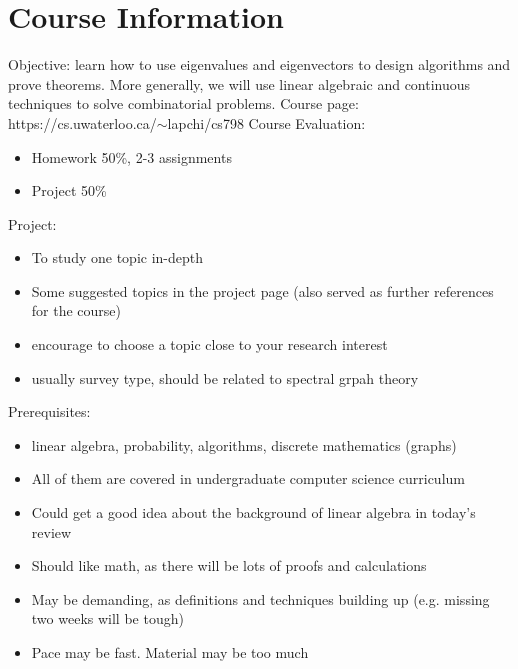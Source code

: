 \documentclass[11pt,a4paper]{report}
\theoremstyle{theoremdd}
\theoremstyle{claims1}
\theoremstyle{proofs1}
\newenvironment{courseeval}[1][default]
	{#1 \begin{minipage}[t]{\linewidth}\begin{itemize}}
	{\end{itemize}\end{minipage}}
\begin{document}
\section{Course Information}
Objective: learn how to use eigenvalues and eigenvectors to design algorithms and prove theorems. More generally, we will use linear algebraic and continuous techniques to solve combinatorial problems.
\newline\newline
Course page: https://cs.uwaterloo.ca/$\sim$lapchi/cs798
\newline\newline
\begin{courseeval}[Course Evaluation:]
	\setlength\itemsep{0.01em}
	\item Homework 50\%, 2-3 assignments
	\item Project 50\%
\end{courseeval}
\newline\newline
\begin{courseeval}[Project:]
	\setlength\itemsep{0.01em}
	\item To study one topic in-depth
	\item Some suggested topics in the project page (also served as further references for the course)
	\item encourage to choose a topic close to your research interest
	\item usually survey type, should be related to spectral grpah theory
\end{courseeval}
\newline\newline
\begin{courseeval}[Prerequisites:]
	\setlength\itemsep{0.01em}
	\item[] linear algebra, probability, algorithms, discrete mathematics (graphs)
	\item[] All of them are covered in undergraduate computer science curriculum
	\item[] Could get a good idea about the background of linear algebra in today's review
	\item[] Should like math, as there will be lots of proofs and calculations
	\item[] May be demanding, as definitions and techniques building up (e.g. missing two weeks will be tough)
	\item[] Pace may be fast. Material may be too much
\end{courseeval}
\end{document}
